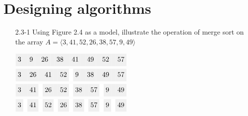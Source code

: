 \pagebreak

\section{Designing algorithms}

\begin{enumerate}

\item[2.3{-}1]{Using Figure 2.4 as a model, illustrate the operation of merge
sort on the array $A = \langle 3,41, 52, 26, 38, 57, 9, 49 \rangle$}

\begin{framed}

{\centering $ \displaystyle
\begin{aligned}
  \colorbox{gray!12}{\strut 3} \colorbox{gray!12}{\strut} \colorbox{gray!12}{\strut 9} \colorbox{gray!12}{\strut}
  \colorbox{gray!12}{\strut26} \colorbox{gray!12}{\strut} \colorbox{gray!12}{\strut38} \colorbox{gray!12}{\strut}
  \colorbox{gray!12}{\strut41} \colorbox{gray!12}{\strut} \colorbox{gray!12}{\strut49} \colorbox{gray!12}{\strut}
  \colorbox{gray!12}{\strut52} \colorbox{gray!12}{\strut} \colorbox{gray!12}{\strut57}\\
%
  \colorbox{gray!12}{\strut 3} \colorbox{gray!12}{\strut} \colorbox{gray!12}{\strut26} \colorbox{gray!12}{\strut}
  \colorbox{gray!12}{\strut41} \colorbox{gray!12}{\strut} \colorbox{gray!12}{\strut52} \colorbox{white}{\strut}
  \colorbox{gray!12}{\strut 9} \colorbox{gray!12}{\strut} \colorbox{gray!12}{\strut38} \colorbox{gray!12}{\strut}
  \colorbox{gray!12}{\strut49} \colorbox{gray!12}{\strut} \colorbox{gray!12}{\strut57}\\
%
  \colorbox{gray!12}{\strut 3} \colorbox{gray!12}{\strut} \colorbox{gray!12}{\strut41} \colorbox{white}{\strut}
  \colorbox{gray!12}{\strut26} \colorbox{gray!12}{\strut} \colorbox{gray!12}{\strut52} \colorbox{white}{\strut}
  \colorbox{gray!12}{\strut38} \colorbox{gray!12}{\strut} \colorbox{gray!12}{\strut57} \colorbox{white}{\strut}
  \colorbox{gray!12}{\strut 9} \colorbox{gray!12}{\strut} \colorbox{gray!12}{\strut49}\\
%
  \colorbox{gray!12}{\strut 3} \colorbox{white}{\strut}   \colorbox{gray!12}{\strut41} \colorbox{white}{\strut}
  \colorbox{gray!12}{\strut52} \colorbox{white}{\strut}   \colorbox{gray!12}{\strut26} \colorbox{white}{\strut}
  \colorbox{gray!12}{\strut38} \colorbox{white}{\strut}   \colorbox{gray!12}{\strut57} \colorbox{white}{\strut}
  \colorbox{gray!12}{\strut 9} \colorbox{white}{\strut}   \colorbox{gray!12}{\strut49}\\
\end{aligned} $ \par} %


\end{framed}
\end{enumerate}
